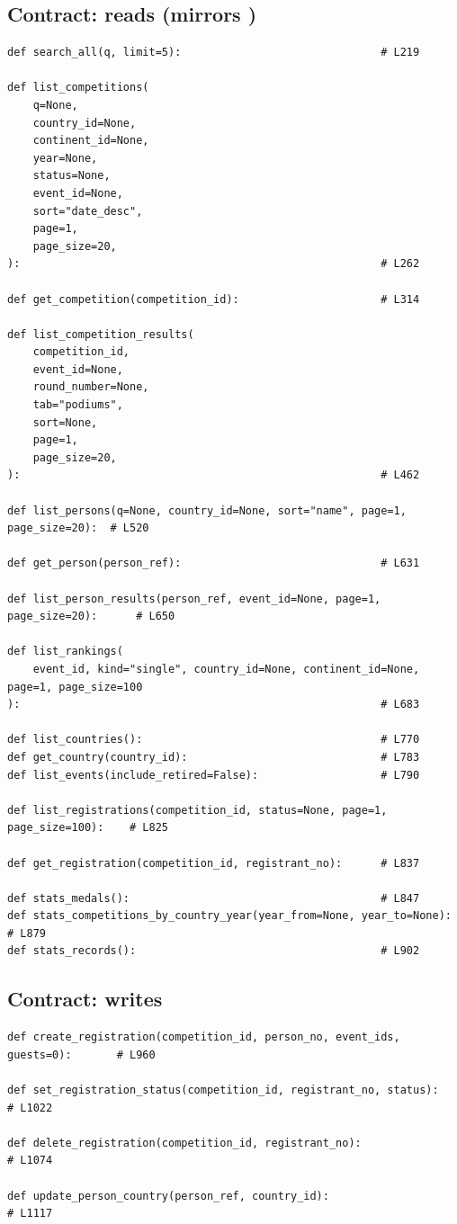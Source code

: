 \documentclass[11pt,a4paper]{article}
\newcommand{\filepath}[1]{\texttt{\detokenize{#1}}}
\begin{document}
\subsection*{Contract: reads (mirrors \filepath{real.py})}
\begin{lstlisting}
def search_all(q, limit=5):                               # L219

def list_competitions(
    q=None,
    country_id=None,
    continent_id=None,
    year=None,
    status=None,
    event_id=None,
    sort="date_desc",
    page=1,
    page_size=20,
):                                                        # L262

def get_competition(competition_id):                      # L314

def list_competition_results(
    competition_id,
    event_id=None,
    round_number=None,
    tab="podiums",
    sort=None,
    page=1,
    page_size=20,
):                                                        # L462

def list_persons(q=None, country_id=None, sort="name", page=1, page_size=20):  # L520

def get_person(person_ref):                               # L631

def list_person_results(person_ref, event_id=None, page=1, page_size=20):      # L650

def list_rankings(
    event_id, kind="single", country_id=None, continent_id=None, page=1, page_size=100
):                                                        # L683

def list_countries():                                     # L770
def get_country(country_id):                              # L783
def list_events(include_retired=False):                   # L790

def list_registrations(competition_id, status=None, page=1, page_size=100):    # L825

def get_registration(competition_id, registrant_no):      # L837

def stats_medals():                                       # L847
def stats_competitions_by_country_year(year_from=None, year_to=None):          # L879
def stats_records():                                      # L902
\end{lstlisting}

\subsection*{Contract: writes}
\begin{lstlisting}
def create_registration(competition_id, person_no, event_ids, guests=0):       # L960

def set_registration_status(competition_id, registrant_no, status):            # L1022

def delete_registration(competition_id, registrant_no):                        # L1074

def update_person_country(person_ref, country_id):                             # L1117
\end{lstlisting}
\end{document}
